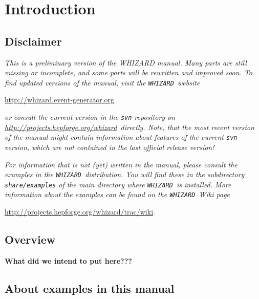 \documentclass[12pt]{book}
\newcommand{\whizardpage}{\url{http://whizard.event-generator.org}}
\newcommand{\hepforgepage}{\url{http://projects.hepforge.org/whizard}}
\newcommand{\whizardwiki}{\url{http://projects.hepforge.org/whizard/trac/wiki}}
\newcommand{\whizard}{\texttt{WHIZARD}}
\begin{document}
\tableofcontents

\newpage
\chapter{Introduction}

\section{Disclaimer}

\emph{This is a preliminary version of the WHIZARD manual.  Many parts
  are still missing or incomplete, and some parts will be rewritten and
  improved soon.  To find updated versions of the manual,
  visit the \whizard\ website}
\begin{center}
  \whizardpage
\end{center}
\emph{or consult the current version in the \texttt{svn} repository
  on \hepforgepage\ directly. Note, that the most recent version of
  the manual might contain information about features of the
  current \texttt{svn} version, which are not contained in the last
  official release version!}  

\emph{For information that is not (yet) written in the manual, please
consult the examples in the \whizard\ distribution.  You will find these in
the subdirectory \texttt{share/examples} of the main directory where
\whizard\ is installed. More information about the examples can be
found on the \whizard\ Wiki page}
\begin{center}
  \whizardwiki . 
\end{center}

\clearpage
\section{Overview}

{\bf What did we intend to put here???}

\section{About examples in this manual}
\end{document}
